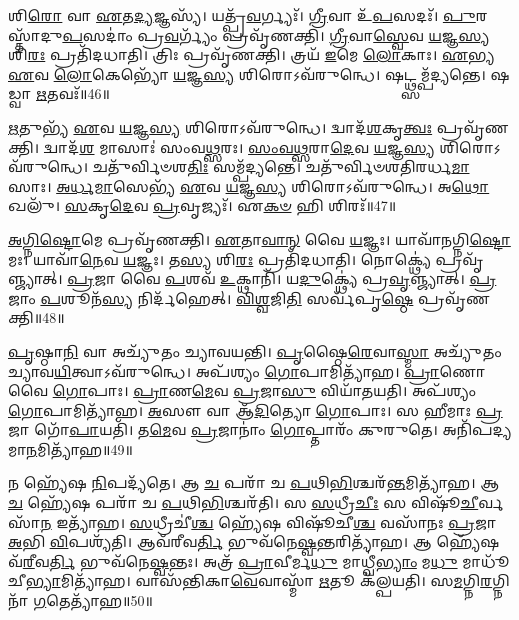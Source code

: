 𑌶𑌿\-\ul{𑌰𑍋} 𑌵𑌾 \ul{𑌏}\-𑌤\-\ul{𑌦𑍍𑌯}\-𑌜𑍍𑌞𑌸𑍍𑌯᳴। 
𑌯𑌤𑍍𑌪𑍍𑌰᳴\-\ul{𑌵}\-𑌰𑍍𑌗𑍍𑌯𑌃᳴। 
\-\ul{𑌗𑍍𑌰𑍀}\-𑌵𑌾 𑌉᳴\-\ul{𑌪}\-𑌸𑌦𑌃᳴। 
\-\ul{𑌪𑍁}\-𑌰𑌸𑍍𑌤𑌾᳴𑌦𑍁\-\ul{𑌪}\-𑌸𑌦𑌾𑌂॑ 𑌪𑍍𑌰\-\ul{𑌵}\-𑌰𑍍𑌗𑍍𑌯𑌂᳴ 𑌪𑍍𑌰𑌵𑍃᳴𑌣𑌕𑍍𑌤𑌿। 
\-\ul{𑌗𑍍𑌰𑍀}\-𑌵𑌾\-\ul{𑌸𑍍𑌵𑍇}\-𑌵 \ul{𑌯}\-𑌜𑍍𑌞\-\ul{𑌸𑍍𑌯} 𑌶𑌿\-\ul{𑌰𑌃} 𑌪𑍍𑌰𑌤𑌿᳴𑌦𑌧𑌾𑌤𑌿। 
𑌤𑍍𑌰𑌿𑌃 𑌪𑍍𑌰𑌵𑍃᳴𑌣𑌕𑍍𑌤𑌿। 
𑌤𑍍𑌰𑌯᳴ \ul{𑌇}\-𑌮𑍇 \ul{𑌲𑍋}\-𑌕𑌾𑌃। 
\-\ul{𑌏}\-𑌭𑍍𑌯 \ul{𑌏}\-𑌵 \ul{𑌲𑍋}\-𑌕𑍇𑌭𑍍𑌯𑍋᳴ \ul{𑌯}\-𑌜𑍍𑌞\-\ul{𑌸𑍍𑌯} 𑌶𑌿𑌰𑍋𑌽𑌵᳴𑌰𑍁𑌨𑍍𑌧𑍇। 
𑌷𑌟𑍍𑌥𑍍𑌸𑌮𑍍𑌪᳴𑌦𑍍𑌯𑌨𑍍𑌤𑍇। 
𑌷𑌡𑍍𑌵𑌾 \ul{𑌋}\-𑌤𑌵𑌃᳴॥46॥

\-\ul{𑌋}\-𑌤𑍁𑌭𑍍𑌯᳴ \ul{𑌏}\-𑌵 \ul{𑌯}\-𑌜𑍍𑌞\-\ul{𑌸𑍍𑌯} 𑌶𑌿𑌰𑍋𑌽𑌵᳴𑌰𑍁𑌨𑍍𑌧𑍇। 
𑌦𑍍𑌵𑌾𑌦᳴\-\ul{𑌶}\-𑌕𑍃\-\ul{𑌤𑍍𑌵𑌃} 𑌪𑍍𑌰𑌵𑍃᳴𑌣𑌕𑍍𑌤𑌿। 
𑌦𑍍𑌵𑌾𑌦᳴\-\ul{𑌶} 𑌮𑌾𑌸𑌾𑌃॑ 𑌸𑌂𑌵\-\ul{𑌥𑍍𑌸}\-𑌰𑌃। 
\-\ul{𑌸𑌂}\-\-\ul{𑌵}\-\-\ul{𑌥𑍍𑌸}\-𑌰𑌾\-\ul{𑌦𑍇}\-𑌵 \ul{𑌯}\-𑌜𑍍𑌞\-\ul{𑌸𑍍𑌯} 𑌶𑌿𑌰𑍋𑌽𑌵᳴𑌰𑍁𑌨𑍍𑌧𑍇। 
𑌚𑌤𑍁᳴𑌰𑍍𑌵𑌿𑍞𑌶\-\ul{𑌤𑌿𑌃} 𑌸𑌮𑍍𑌪᳴𑌦𑍍𑌯𑌨𑍍𑌤𑍇। 
𑌚𑌤𑍁᳴𑌰𑍍𑌵𑌿𑍞𑌶𑌤𑌿𑌰𑌰𑍍𑌧\-\ul{𑌮𑌾}\-𑌸𑌾𑌃। 
\-\ul{𑌅}\-\-\ul{𑌰𑍍𑌧}\-\-\ul{𑌮𑌾}\-𑌸𑍇𑌭𑍍𑌯᳴ \ul{𑌏}\-𑌵 \ul{𑌯}\-𑌜𑍍𑌞\-\ul{𑌸𑍍𑌯} 𑌶𑌿𑌰𑍋𑌽𑌵᳴𑌰𑍁𑌨𑍍𑌧𑍇। 
𑌅\-\ul{𑌥𑍋} 𑌖𑌲𑍁᳴। 
\-\ul{𑌸}\-𑌕𑍃\-\ul{𑌦𑍇}\-𑌵 \ul{𑌪𑍍𑌰}\-𑌵𑍃𑌜𑍍𑌯𑌃᳴। 
𑌏\-\ul{𑌕}\-\-\ul{𑍞} 𑌹𑌿 𑌶𑌿𑌰𑌃᳴॥47॥

\-\ul{𑌅}\-\-\ul{𑌗𑍍𑌨𑌿}\-\-\ul{𑌷𑍍𑌟𑍋}\-𑌮𑍇 𑌪𑍍𑌰𑌵𑍃᳴𑌣𑌕𑍍𑌤𑌿। 
\-\ul{𑌏}\-𑌤𑌾\-\ul{𑌵𑌾}\-\-\ul{𑌨𑍍} 𑌵𑍈 \ul{𑌯}\-𑌜𑍍𑌞𑌃। 
𑌯𑌾𑌵𑌾᳴𑌨𑌗𑍍𑌨𑌿\-\ul{𑌷𑍍𑌟𑍋}\-𑌮𑌃। 
𑌯𑌾𑌵𑌾᳴\-\ul{𑌨𑍇}\-𑌵 \ul{𑌯}\-𑌜𑍍𑌞𑌃। 
𑌤\-\ul{𑌸𑍍𑌯} 𑌶𑌿\-\ul{𑌰𑌃} 𑌪𑍍𑌰𑌤𑌿᳴𑌦𑌧𑌾𑌤𑌿। 
𑌨𑍋𑌕𑍍𑌥𑍍𑌯𑍇॑ 𑌪𑍍𑌰𑌵𑍃᳴𑌞𑍍𑌜𑍍𑌯𑌾𑌤𑍍। 
\-\ul{𑌪𑍍𑌰}\-𑌜𑌾 𑌵𑍈 \ul{𑌪}\-𑌶𑌵᳴ \ul{𑌉}\-𑌕𑍍𑌥𑌾𑌨𑌿᳴। 
𑌯\-\ul{𑌦𑍁}\-𑌕𑍍𑌥𑍍𑌯𑍇॑ 𑌪𑍍𑌰\-\ul{𑌵𑍃}\-𑌞𑍍𑌜𑍍𑌯𑌾𑌤𑍍। 
\-\ul{𑌪𑍍𑌰}\-𑌜𑌾𑌂 \ul{𑌪}\-𑌶𑍂𑌨᳴\-\ul{𑌸𑍍𑌯} 𑌨𑌿𑌰𑍍𑌦᳴𑌹𑍇𑌤𑍍। 
\-\ul{𑌵𑌿}\-\-\ul{𑌶𑍍𑌵}\-𑌜𑌿\-\ul{𑌤𑌿} 𑌸𑌰𑍍𑌵᳴𑌪𑍃\-\ul{𑌷𑍍𑌠𑍇} 𑌪𑍍𑌰𑌵𑍃᳴𑌣𑌕𑍍𑌤𑌿॥48॥

\-\ul{𑌪𑍃}\-𑌷𑍍𑌠𑌾\-\ul{𑌨𑌿} 𑌵𑌾 𑌅𑌚𑍍𑌯𑍁᳴𑌤𑌂 𑌚𑍍𑌯𑌾𑌵𑌯𑌨𑍍𑌤𑌿। 
\-\ul{𑌪𑍃}\-𑌷𑍍𑌠𑍈\-\ul{𑌰𑍇}\-𑌵𑌾\-\ul{𑌸𑍍𑌮𑌾} 𑌅𑌚𑍍𑌯𑍁᳴𑌤𑌂 𑌚𑍍𑌯𑌾𑌵\-\ul{𑌯𑌿}\-𑌤𑍍𑌵𑌾𑌽𑌵᳴𑌰𑍁𑌨𑍍𑌧𑍇। 
𑌅𑌪᳴𑌶𑍍𑌯𑌂 \ul{𑌗𑍋}\-𑌪𑌾𑌮𑌿𑌤𑍍𑌯𑌾᳴𑌹। 
\-\ul{𑌪𑍍𑌰𑌾}\-𑌣𑍋 𑌵𑍈 \ul{𑌗𑍋}\-𑌪𑌾𑌃। 
\-\ul{𑌪𑍍𑌰𑌾}\-𑌣\-\ul{𑌮𑍇}\-𑌵 \ul{𑌪𑍍𑌰}\-𑌜𑌾\-\ul{𑌸𑍁} 𑌵𑌿𑌯𑌾᳴𑌤𑌯𑌤𑌿। 
𑌅𑌪᳴𑌶𑍍𑌯𑌂 \ul{𑌗𑍋}\-𑌪𑌾𑌮𑌿𑌤𑍍𑌯𑌾᳴𑌹। 
\-\ul{𑌅}\-𑌸𑍗 𑌵𑌾 𑌆᳴\-\ul{𑌦𑌿}\-𑌤𑍍𑌯𑍋 \ul{𑌗𑍋}\-𑌪𑌾𑌃। 
𑌸 𑌹𑍀𑌮𑌾𑌃 \ul{𑌪𑍍𑌰}\-𑌜𑌾 𑌗𑍋᳴\-\ul{𑌪𑌾}\-𑌯𑌤𑌿᳴। 
𑌤\-\ul{𑌮𑍇}\-𑌵 \ul{𑌪𑍍𑌰}\-𑌜𑌾𑌨𑌾𑌂॑ \ul{𑌗𑍋}\-𑌪𑍍𑌤𑌾𑌰𑌂᳴ 𑌕𑍁𑌰𑍁𑌤𑍇। 
𑌅𑌨𑌿᳴𑌪𑌦𑍍𑌯𑌮𑌾\-\ul{𑌨}\-𑌮𑌿𑌤𑍍𑌯𑌾᳴𑌹॥49॥

𑌨 𑌹𑍍𑌯𑍇᳴𑌷 \ul{𑌨𑌿}\-𑌪𑌦𑍍𑌯᳴𑌤𑍇। 
𑌆 \ul{𑌚} 𑌪𑌰𑌾᳴ 𑌚 \ul{𑌪}\-𑌥𑌿\-\ul{𑌭𑌿}\-𑌶𑍍𑌚𑌰᳴\-\ul{𑌨𑍍𑌤}\-𑌮𑌿𑌤𑍍𑌯𑌾᳴𑌹। 
𑌆 \ul{𑌚} 𑌹𑍍𑌯𑍇᳴𑌷 𑌪𑌰𑌾᳴ 𑌚 \ul{𑌪}\-𑌥𑌿\-\ul{𑌭𑌿}\-𑌶𑍍𑌚𑌰᳴𑌤𑌿। 
𑌸 \ul{𑌸}\-𑌧𑍍𑌰𑍀\-\ul{𑌚𑍀𑌃} 𑌸 𑌵𑌿𑌷𑍂᳴\-\ul{𑌚𑍀}\-𑌰𑍍𑌵𑌸𑌾᳴\-\ul{𑌨} 𑌇𑌤𑍍𑌯𑌾᳴𑌹। 
\-\ul{𑌸}\-𑌧𑍍𑌰𑍀𑌚𑍀॑\-\ul{𑌶𑍍𑌚} 𑌹𑍍𑌯𑍇᳴𑌷 𑌵𑌿𑌷𑍂᳴𑌚𑍀\-\ul{𑌶𑍍𑌚} 𑌵𑌸𑌾᳴𑌨𑌃 \ul{𑌪𑍍𑌰}\-𑌜𑌾 \ul{𑌅}\-𑌭𑌿 \ul{𑌵𑌿}\-𑌪𑌶𑍍𑌯᳴𑌤𑌿। 
𑌆𑌵᳴𑌰𑍀𑌵\-\ul{𑌰𑍍𑌤𑌿} 𑌭𑍁𑌵᳴𑌨𑍇\-\ul{𑌷𑍍𑌵}\-𑌨𑍍𑌤𑌰𑌿𑌤𑍍𑌯𑌾᳴𑌹। 
𑌆 𑌹𑍍𑌯𑍇᳴𑌷 𑌵᳴\-\ul{𑌰𑍀}\-𑌵\-\ul{𑌰𑍍𑌤𑌿} 𑌭𑍁𑌵᳴𑌨𑍇\-\ul{𑌷𑍍𑌵}\-𑌨𑍍𑌤𑌃। 
𑌅𑌤𑍍𑌰᳴ \ul{𑌪𑍍𑌰𑌾}\-𑌵𑍀𑌰𑍍𑌮\-\ul{𑌧𑍁} 𑌮𑌾𑌧𑍍𑌵𑍀॑\-\ul{𑌭𑍍𑌯𑌾𑌂} 𑌮\-\ul{𑌧𑍁} 𑌮𑌾𑌧𑍂᳴𑌚𑍀\-\ul{𑌭𑍍𑌯𑌾}\-𑌮𑌿𑌤𑍍𑌯𑌾᳴𑌹। 
𑌵𑌾𑌸᳴𑌨𑍍𑌤𑌿𑌕𑌾\-\ul{𑌵𑍇}\-𑌵𑌾𑌸𑍍𑌮𑌾᳴ \ul{𑌋}\-𑌤𑍂 𑌕᳴𑌲𑍍𑌪𑌯𑌤𑌿। 
𑌸\-\ul{𑌮}\-𑌗𑍍𑌨𑌿\-\ul{𑌰}\-𑌗𑍍𑌨𑌿𑌨𑌾᳴ \ul{𑌗}\-𑌤𑍇𑌤𑍍𑌯𑌾᳴𑌹॥50॥

